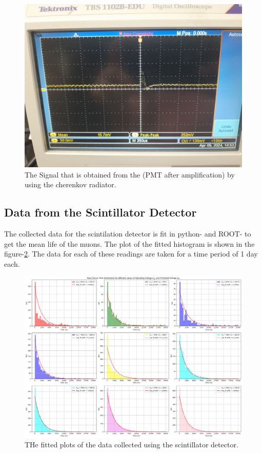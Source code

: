 \documentclass{article}
\begin{document}
\begin{multicols}{2}
\begin{figure}[H]
    \centering
    \includegraphics[width = \columnwidth]{Images/pulse_amp_cher.jpeg}
    \caption{The Signal that is obtained from the (PMT after amplification) by using the cherenkov radiator.}
    \label{pulse_dir_cher}
\end{figure}



\subsection{Data from the Scintillator Detector}
The collected data for the scintilation detector is fit in python-\cite{python} and ROOT-\cite{ROOT} to get the mean life of the muons. The plot of the fitted histogram is shown in the figure-\ref{scintplots}. The data for each of these readings are taken for a time period of 1 day each.
\begin{figure}
    \centering
    \includegraphics[width = 2\columnwidth]{Images/scint_plots.png}
    \caption{THe fitted plots of the data collected using the scintillator detector.}
    \label{scintplots}
\end{figure}


\end{multicols}
\end{document}
